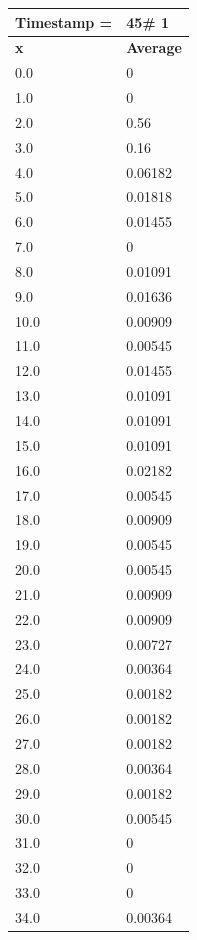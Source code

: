 \begin{tabular}{|l||l|}
\hline
\textbf{Timestamp =} & \textbf{45}\# 1\\\hline
	\textbf{x} & \textbf{Average} \\ \hline
\hline
	0.0 & 0 \\ \hline
	1.0 & 0 \\ \hline
	2.0 & 0.56 \\ \hline
	3.0 & 0.16 \\ \hline
	4.0 & 0.06182 \\ \hline
	5.0 & 0.01818 \\ \hline
	6.0 & 0.01455 \\ \hline
	7.0 & 0 \\ \hline
	8.0 & 0.01091 \\ \hline
	9.0 & 0.01636 \\ \hline
	10.0 & 0.00909 \\ \hline
	11.0 & 0.00545 \\ \hline
	12.0 & 0.01455 \\ \hline
	13.0 & 0.01091 \\ \hline
	14.0 & 0.01091 \\ \hline
	15.0 & 0.01091 \\ \hline
	16.0 & 0.02182 \\ \hline
	17.0 & 0.00545 \\ \hline
	18.0 & 0.00909 \\ \hline
	19.0 & 0.00545 \\ \hline
	20.0 & 0.00545 \\ \hline
	21.0 & 0.00909 \\ \hline
	22.0 & 0.00909 \\ \hline
	23.0 & 0.00727 \\ \hline
	24.0 & 0.00364 \\ \hline
	25.0 & 0.00182 \\ \hline
	26.0 & 0.00182 \\ \hline
	27.0 & 0.00182 \\ \hline
	28.0 & 0.00364 \\ \hline
	29.0 & 0.00182 \\ \hline
	30.0 & 0.00545 \\ \hline
	31.0 & 0 \\ \hline
	32.0 & 0 \\ \hline
	33.0 & 0 \\ \hline
	34.0 & 0.00364 \\ \hline
\end{tabular}

